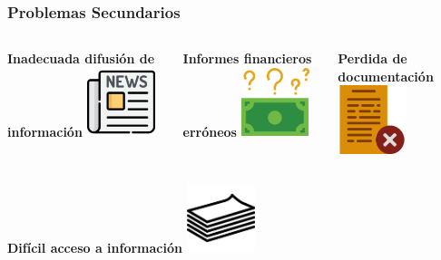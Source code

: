 \documentclass[xcolor=dvipsnames]{beamer}
\begin{document}
\begin{frame}
    \frametitle{Problemas Secundarios}
    \vspace{5mm}
    \begin{columns}
      \begin{column}{0.3\textwidth}
        \centering\textbf{\textcolor{color3}{\small Inadecuada difusión de información}\vspace{3mm}}
        \vspace{10mm}
        \includegraphics[width=20mm]{022-news.pdf}
      \end{column}
      \begin{column}{0.3\textwidth}
        \centering\textbf{\textcolor{color3}{\small Informes financieros erróneos}\vspace{3mm}}
        \vspace{10mm}
        \includegraphics[width=20mm]{018-money-1}
      \end{column}
      \begin{column}{0.3\textwidth}
        \centering\textbf{\textcolor{color3}{\small Perdida de documentación}\vspace{3mm}}
        \vspace{10mm}
        \includegraphics[width=20mm]{023-document}
      \end{column}
    \end{columns}
    \vspace{-2mm}
    \begin{columns}
      \begin{column}{0.3\textwidth}
        \centering\textbf{\textcolor{color3}{\small Difícil acceso a información}\vspace{3mm}}
        \vspace{10mm}
        \includegraphics[width=20mm]{028-paper}

\end{column}
\end{columns}
\end{frame}
\end{document}

